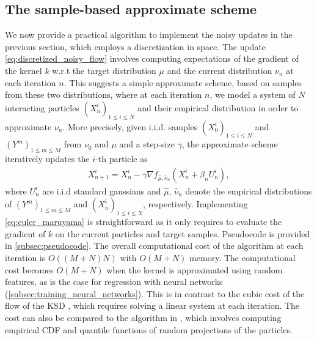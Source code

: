 
\subsection{The sample-based approximate scheme}\label{sec:sample_based}

We now provide a practical algorithm to implement %
the noisy updates in the previous section,
which employs a discretization in space.
The update \eqref{eq:discretized_noisy_flow} involves computing expectations of the gradient of the kernel $k$ w.r.t the target distribution $\mu$ and the current distribution $\nu_n$ at each iteration $n$. This suggests a simple approximate scheme, based on samples from these two distributions, where %
at each iteration $n$, we model a system of $N$ interacting particles $(X_n^i)_{1\leq i\leq N}$  and their empirical distribution in order to approximate $\nu_n$. 
More precisely, given i.i.d. samples $(X^i_0)_{1\leq i\leq N}$ and $(Y^{m})_{1\leq m\leq M}$ from $\nu_0$ and $\mu$ and a step-size $\gamma$, the approximate scheme iteratively updates the $i$-th particle as
\begin{align}\label{eq:euler_maruyama}
X_{n+1}^{i} = X_n^i -\gamma \nabla f_{\hat{\mu},\hat{\nu}_n}(X_n^i+\beta_n U_n^i),
\end{align}
where $U_{n}^{i}$ are i.i.d standard gaussians and $\hat{\mu},\,\hat{\nu}_n$ denote the empirical distributions of $(Y^{m})_{1\leq m\leq M}$ and $(X^i_n)_{1\leq i\leq N}$, respectively. %
Implementing \cref{eq:euler_maruyama} is straightforward as it only requires to evaluate the gradient of $k$ on the current particles and target samples. Pseudocode is provided in \cref{subsec:pseudocode}. 
The overall computational cost of the algorithm at each iteration is $O((M+N)N)$ with $O(M+N)$ memory. The computational cost becomes  $O(M+N)$ when the kernel is approximated using random features, as  is the case for regression with neural networks (\cref{subsec:training_neural_networks}). 
This is in contrast to the cubic cost of the flow of the KSD \cite{Mroueh:2019}, which requires solving a linear system at each iteration. The cost can also be compared to the algorithm in  \cite{csimcsekli2018sliced}, which involves computing empirical CDF and quantile functions of random projections of the particles.

